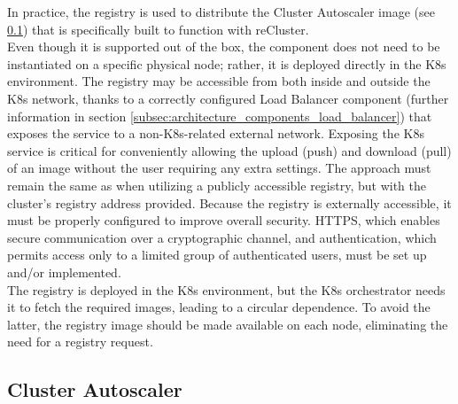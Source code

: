 In practice, the registry is used to distribute the Cluster Autoscaler image (see
\ref{subsec:architecture_components_cluster_autoscaler}) that is specifically built
to function with reCluster. \\ %
Even though it is supported out of the box, the component does not need to be
instantiated on a specific physical node; rather, it is deployed directly in the
K8s environment. The registry may be accessible from both inside and outside the
K8s network, thanks to a correctly configured Load Balancer component (further information
in section \ref{subsec:architecture_components_load_balancer}) that exposes the
service to a non-K8s-related external network. Exposing the K8s service is critical
for conveniently allowing the upload (push) and download (pull) of an image without
the user requiring any extra settings. The approach must remain the same as when
utilizing a publicly accessible registry, but with the cluster's registry address
provided. Because the registry is externally accessible, it must be properly configured
to improve overall security. HTTPS, which enables secure communication over a cryptographic
channel, and authentication, which permits access only to a limited group of authenticated
users, must be set up and/or implemented. \\ %
The registry is deployed in the K8s environment, but the K8s orchestrator needs it
to fetch the required images, leading to a circular dependence. To avoid the latter,
the registry image should be made available on each node, eliminating the need for
a registry request.

\subsection{Cluster Autoscaler}
\label{subsec:architecture_components_cluster_autoscaler}

